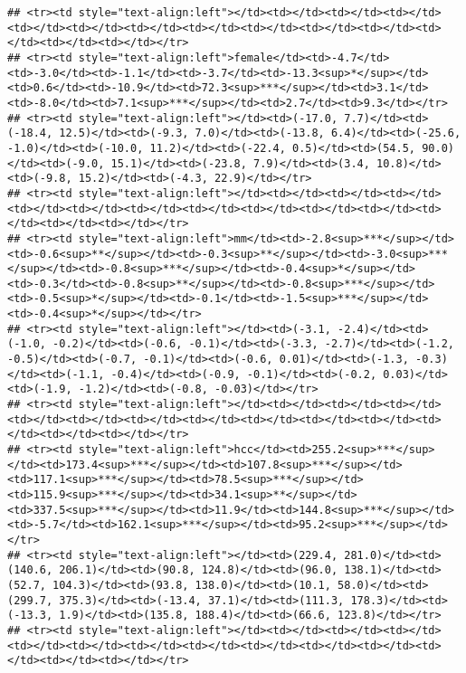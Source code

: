 \documentclass[]{article}
\begin{document}
\begin{verbatim}
## <tr><td style="text-align:left"></td><td></td><td></td><td></td><td></td><td></td><td></td><td></td><td></td><td></td><td></td><td></td><td></td><td></td></tr>
## <tr><td style="text-align:left">female</td><td>-4.7</td><td>-3.0</td><td>-1.1</td><td>-3.7</td><td>-13.3<sup>*</sup></td><td>0.6</td><td>-10.9</td><td>72.3<sup>***</sup></td><td>3.1</td><td>-8.0</td><td>7.1<sup>***</sup></td><td>2.7</td><td>9.3</td></tr>
## <tr><td style="text-align:left"></td><td>(-17.0, 7.7)</td><td>(-18.4, 12.5)</td><td>(-9.3, 7.0)</td><td>(-13.8, 6.4)</td><td>(-25.6, -1.0)</td><td>(-10.0, 11.2)</td><td>(-22.4, 0.5)</td><td>(54.5, 90.0)</td><td>(-9.0, 15.1)</td><td>(-23.8, 7.9)</td><td>(3.4, 10.8)</td><td>(-9.8, 15.2)</td><td>(-4.3, 22.9)</td></tr>
## <tr><td style="text-align:left"></td><td></td><td></td><td></td><td></td><td></td><td></td><td></td><td></td><td></td><td></td><td></td><td></td><td></td></tr>
## <tr><td style="text-align:left">mm</td><td>-2.8<sup>***</sup></td><td>-0.6<sup>**</sup></td><td>-0.3<sup>**</sup></td><td>-3.0<sup>***</sup></td><td>-0.8<sup>***</sup></td><td>-0.4<sup>*</sup></td><td>-0.3</td><td>-0.8<sup>**</sup></td><td>-0.8<sup>***</sup></td><td>-0.5<sup>*</sup></td><td>-0.1</td><td>-1.5<sup>***</sup></td><td>-0.4<sup>*</sup></td></tr>
## <tr><td style="text-align:left"></td><td>(-3.1, -2.4)</td><td>(-1.0, -0.2)</td><td>(-0.6, -0.1)</td><td>(-3.3, -2.7)</td><td>(-1.2, -0.5)</td><td>(-0.7, -0.1)</td><td>(-0.6, 0.01)</td><td>(-1.3, -0.3)</td><td>(-1.1, -0.4)</td><td>(-0.9, -0.1)</td><td>(-0.2, 0.03)</td><td>(-1.9, -1.2)</td><td>(-0.8, -0.03)</td></tr>
## <tr><td style="text-align:left"></td><td></td><td></td><td></td><td></td><td></td><td></td><td></td><td></td><td></td><td></td><td></td><td></td><td></td></tr>
## <tr><td style="text-align:left">hcc</td><td>255.2<sup>***</sup></td><td>173.4<sup>***</sup></td><td>107.8<sup>***</sup></td><td>117.1<sup>***</sup></td><td>78.5<sup>***</sup></td><td>115.9<sup>***</sup></td><td>34.1<sup>**</sup></td><td>337.5<sup>***</sup></td><td>11.9</td><td>144.8<sup>***</sup></td><td>-5.7</td><td>162.1<sup>***</sup></td><td>95.2<sup>***</sup></td></tr>
## <tr><td style="text-align:left"></td><td>(229.4, 281.0)</td><td>(140.6, 206.1)</td><td>(90.8, 124.8)</td><td>(96.0, 138.1)</td><td>(52.7, 104.3)</td><td>(93.8, 138.0)</td><td>(10.1, 58.0)</td><td>(299.7, 375.3)</td><td>(-13.4, 37.1)</td><td>(111.3, 178.3)</td><td>(-13.3, 1.9)</td><td>(135.8, 188.4)</td><td>(66.6, 123.8)</td></tr>
## <tr><td style="text-align:left"></td><td></td><td></td><td></td><td></td><td></td><td></td><td></td><td></td><td></td><td></td><td></td><td></td><td></td></tr>

\end{verbatim}
\end{document}
